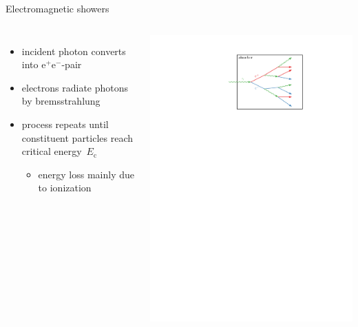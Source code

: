 \documentclass[11pt,xcolor=dvipsnames,professionalfonts,notes]{beamer}
\begin{document}
\begin{frame}{Electromagnetic showers}
	\begin{columns}
		\begin{itemize}
			\setlength\itemsep{1.5em}
			\item incident photon converts into $\mathrm{e}^+\mathrm{e}^-$-pair
			
			\item electrons radiate photons by bremsstrahlung
			
			\item process repeats until constituent particles reach critical energy~$E_\mathrm{c}$
			\begin{itemize}
				\item energy loss mainly due to ionization
			\end{itemize}
						
		\end{itemize}
		
			\begin{center}
				\includegraphics[width=1.0\textwidth]{./figures/shower_intro.pdf}
			\end{center}
	\end{columns}
\end{frame}
\end{document}
